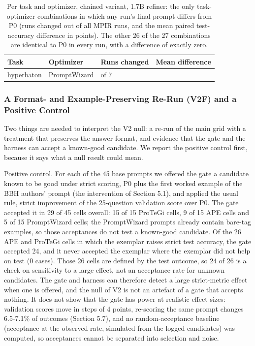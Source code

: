 \documentclass{ieeeaccess}
\begin{document}
\begin{table}[htbp]
\centering
\small
\caption{Per task and optimizer, chained variant, 1.7B refiner: the only task-optimizer combinations in which any run's final prompt differs from P0 (runs changed out of all MPIR runs, and the mean paired test-accuracy difference in points). The other 26 of the 27 combinations are identical to P0 in every run, with a difference of exactly zero.}
\begin{tabular}{>{\raggedright\arraybackslash}p{}>{\raggedright\arraybackslash}p{}>{\raggedright\arraybackslash}p{}>{\raggedright\arraybackslash}p{}}
\toprule
\textbf{Task} & \textbf{Optimizer} & \textbf{Runs changed} & \textbf{Mean difference} \\
\midrule
hyperbaton & PromptWizard & 1 of 7 & -0.6 \\
\bottomrule
\end{tabular}
\end{table}

\subsubsection{A Format- and Example-Preserving Re-Run (V2F) and a Positive Control}

Two things are needed to interpret the V2 null: a re-run of the main grid with a treatment that preserves the answer format, and evidence that the gate and the harness can accept a known-good candidate. We report the positive control first, because it says what a null result could mean.

Positive control. For each of the 45 base prompts we offered the gate a candidate known to be good under strict scoring, P0 plus the first worked example of the BBH authors' prompt (the intervention of Section 5.1), and applied the usual rule, strict improvement of the 25-question validation score over P0. The gate accepted it in 29 of 45 cells overall: 15 of 15 ProTeGi cells, 9 of 15 APE cells and 5 of 15 PromptWizard cells; the PromptWizard prompts already contain bare-tag examples, so those acceptances do not test a known-good candidate. Of the 26 APE and ProTeGi cells in which the exemplar raises strict test accuracy, the gate accepted 24, and it never accepted the exemplar where the exemplar did not help on test (0 cases). Those 26 cells are defined by the test outcome, so 24 of 26 is a check on sensitivity to a large effect, not an acceptance rate for unknown candidates. The gate and harness can therefore detect a large strict-metric effect when one is offered, and the null of V2 is not an artefact of a gate that accepts nothing. It does not show that the gate has power at realistic effect sizes: validation scores move in steps of 4 points, re-scoring the same prompt changes 6.5-7.1\% of outcomes (Section 5.7), and no random-acceptance baseline (acceptance at the observed rate, simulated from the logged candidates) was computed, so acceptances cannot be separated into selection and noise.
\end{document}
